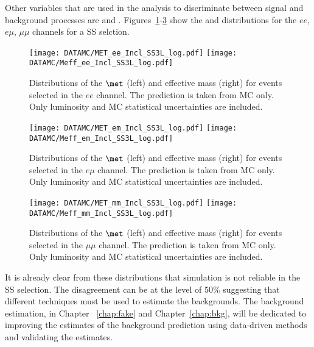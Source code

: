 Other variables that are used in the analysis to discriminate between signal and background processes are \met and \meff. 
Figures~\ref{fig:dataMC_metmeff.ee}-\ref{fig:dataMC_metmeff.mm} show the \met and \meff distributions for the $ee$, $e\mu$, $\mu\mu$ channels for a SS selction.
 \begin{figure}[htb!]
 \centering
 {\texttt{[image: DATAMC/MET\_ee\_Incl\_SS3L\_log.pdf]}}
 {\texttt{[image: DATAMC/Meff\_ee\_Incl\_SS3L\_log.pdf]}}
\caption{Distributions of the $\met$ (left) and effective mass (right) for events selected in the $ee$ channel.  The prediction is taken from MC only. 
Only luminosity and MC statistical uncertainties are included.}
\label{fig:dataMC_metmeff.ee}
\end{figure}
 \begin{figure}[htb!]
 \centering
{\texttt{[image: DATAMC/MET\_em\_Incl\_SS3L\_log.pdf]}}
{\texttt{[image: DATAMC/Meff\_em\_Incl\_SS3L\_log.pdf]}}
\caption{Distributions of the $\met$ (left) and effective mass (right) for events selected in the $e\mu$ channel.  The prediction is taken from MC only.  
Only luminosity and MC statistical uncertainties are included.}
\label{fig:dataMC_metmeff.em}
\end{figure}
 \begin{figure}[htb!]
 \centering
{\texttt{[image: DATAMC/MET\_mm\_Incl\_SS3L\_log.pdf]}}
{\texttt{[image: DATAMC/Meff\_mm\_Incl\_SS3L\_log.pdf]}}
\caption{Distributions of the $\met$ (left) and effective mass (right) for events selected in the $\mu\mu$ channel.  The prediction is taken from MC only.  Only luminosity and MC statistical uncertainties are included.}
\label{fig:dataMC_metmeff.mm}
\end{figure}

It is already clear from these distributions that simulation is not reliable in the SS selection. The disagreement can be at the level 
of 50\% suggesting that different techniques must be used to estimate the backgrounds. 
The background estimation, in Chapter ~\ref{chap:fake} and Chapter~\ref{chap:bkg}, will be dedicated to improving the estimates of 
the background prediction using data-driven methods and validating the estimates.
